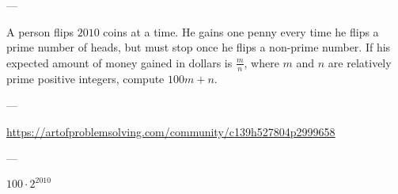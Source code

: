 
---

A person flips $2010$ coins at a time. He gains one penny every time he flips a prime number of heads, but must stop once he flips a non-prime number. If his expected amount of money gained in dollars is $\frac mn$, where $m$ and $n$ are relatively prime positive integers, compute $100m+n$.

---

\url{https://artofproblemsolving.com/community/c139h527804p2999658}

---

$100\cdot2^{2010}$
